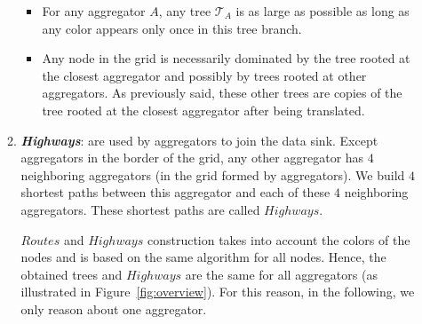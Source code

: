 \begin{enumerate}
\begin{enumerate}
\begin{itemize}
\item For any aggregator $A$, any tree $\mathcal{T}_{A}$ is as large as possible as long as any color appears only once in this tree branch. 
\item Any node in the grid is necessarily dominated by the tree rooted at the closest aggregator and possibly by trees rooted at other aggregators. As previously said, these other trees are copies of the tree rooted at the closest aggregator after being translated.
\end{itemize}

\item \textbf{\textit{Highways}}: are used by aggregators to join the data sink.
Except aggregators in the border of the grid, any other aggregator has 
$4$ neighboring aggregators (in the grid formed by aggregators). We build $4$ shortest paths between this aggregator and each of these $4$ neighboring aggregators. These shortest paths are called $Highways$.


\begin{remark}
$Routes$ and $Highways$ construction takes into account the colors of the nodes and is based on the same algorithm for all nodes. Hence, the obtained trees and $Highways$ are the same for all aggregators (as illustrated in Figure~\ref{fig:overview}). For this reason, in the following, we only reason about one aggregator.
\end{remark}


\end{enumerate}
\end{enumerate}
